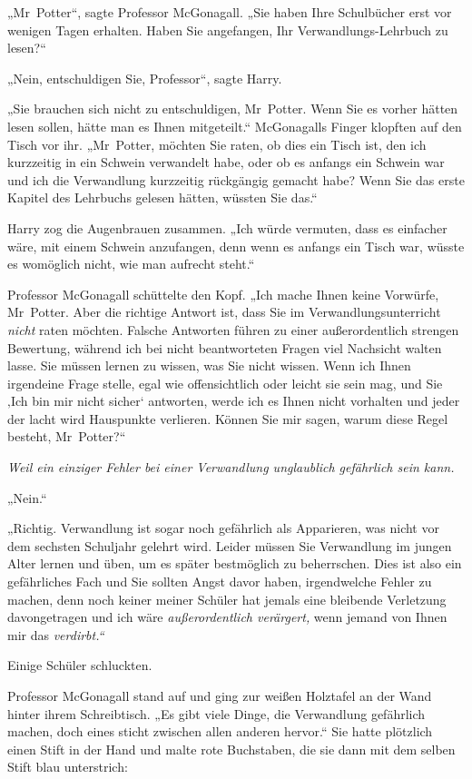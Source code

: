 {„Mr~Potter“, sagte Professor McGonagall. „Sie haben Ihre Schulbücher erst vor wenigen Tagen erhalten. Haben Sie angefangen, Ihr Verwandlungs-Lehrbuch zu lesen?“

„Nein, entschuldigen Sie, Professor“, sagte Harry.

„Sie brauchen sich nicht zu entschuldigen, Mr~Potter. Wenn Sie es vorher hätten lesen sollen, hätte man es Ihnen mitgeteilt.“ McGonagalls Finger klopften auf den Tisch vor ihr. „Mr~Potter, möchten Sie raten, ob dies ein Tisch ist, den ich kurzzeitig in ein Schwein verwandelt habe, oder ob es anfangs ein Schwein war und ich die Verwandlung kurzzeitig rückgängig gemacht habe? Wenn Sie das erste Kapitel des Lehrbuchs gelesen hätten, wüssten Sie das.“

Harry zog die Augenbrauen zusammen. „Ich würde vermuten, dass es einfacher wäre, mit einem Schwein anzufangen, denn wenn es anfangs ein Tisch war, wüsste es womöglich nicht, wie man aufrecht steht.“

Professor McGonagall schüttelte den Kopf. „Ich mache Ihnen keine Vorwürfe, Mr~Potter. Aber die richtige Antwort ist, dass Sie im Verwandlungsunterricht \emph{nicht} raten möchten. Falsche Antworten führen zu einer außerordentlich strengen Bewertung, während ich bei nicht beantworteten Fragen viel Nachsicht walten lasse. Sie müssen lernen zu wissen, was Sie nicht wissen. Wenn ich Ihnen irgendeine Frage stelle, egal wie offensichtlich oder leicht sie sein mag, und Sie ‚Ich bin mir nicht sicher` antworten, werde ich es Ihnen nicht vorhalten und jeder der lacht wird Hauspunkte verlieren. Können Sie mir sagen, warum diese Regel besteht, Mr~Potter?“

\emph{Weil ein einziger Fehler bei einer Verwandlung unglaublich gefährlich sein kann.}

„Nein.“

„Richtig. Verwandlung ist sogar noch gefährlich als Apparieren, was nicht vor dem sechsten Schuljahr gelehrt wird. Leider müssen Sie Verwandlung im jungen Alter lernen und üben, um es später bestmöglich zu beherrschen. Dies ist also ein gefährliches Fach und Sie sollten Angst davor haben, irgendwelche Fehler zu machen, denn noch keiner meiner Schüler hat jemals eine bleibende Verletzung davongetragen und ich wäre \emph{außerordentlich verärgert,} wenn jemand von Ihnen mir das \emph{verdirbt.“}

Einige Schüler schluckten.

Professor McGonagall stand auf und ging zur weißen Holztafel an der Wand hinter ihrem Schreibtisch. „Es gibt viele Dinge, die Verwandlung gefährlich machen, doch eines sticht zwischen allen anderen hervor.“ Sie hatte plötzlich einen Stift in der Hand und malte rote Buchstaben, die sie dann mit dem selben Stift blau unterstrich:

}
